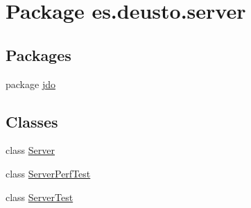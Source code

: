 \hypertarget{namespacees_1_1deusto_1_1server}{}\section{Package es.\+deusto.\+server}
\label{namespacees_1_1deusto_1_1server}
\subsection*{Packages}
\begin{DoxyCompactItemize}
\item 
package \hyperlink{namespacees_1_1deusto_1_1server_1_1jdo}{jdo}
\end{DoxyCompactItemize}
\subsection*{Classes}
\begin{DoxyCompactItemize}
\item 
class \hyperlink{classes_1_1deusto_1_1server_1_1_server}{Server}
\item 
class \hyperlink{classes_1_1deusto_1_1server_1_1_server_perf_test}{Server\+Perf\+Test}
\item 
class \hyperlink{classes_1_1deusto_1_1server_1_1_server_test}{Server\+Test}
\end{DoxyCompactItemize}
